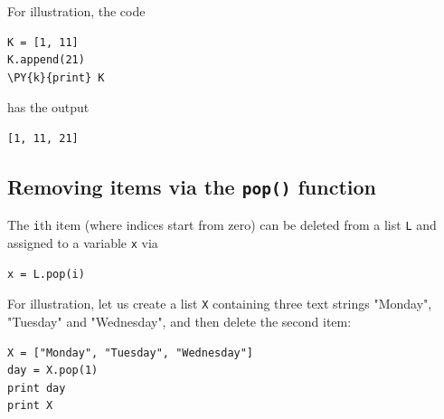 \noindent
For illustration, the code\\

\begin{bbox}
\begin{Verbatim}[commandchars=\\\{\}]
K = [1, 11]
K.append(21)
\PY{k}{print} K
\end{Verbatim}
\end{bbox}
\vspace{6mm}

\noindent
has the output\\

\begin{ybox}
\begin{Verbatim}[commandchars=\\\{\}]
[1, 11, 21]
\end{Verbatim}
\end{ybox}
\vspace{6mm}

\subsection[\ \ Removing items via the {\tt pop()} function]{Removing items via the {\tt pop()} function}

\noindent
The {\tt i}th item (where indices start from zero) can be deleted 
from a list {\tt L} and assigned to a variable {\tt x} via \\

\begin{bbox}
\begin{Verbatim}[commandchars=\\\{\}]
x = L.pop(i)
\end{Verbatim}
\end{bbox}
\vspace{6mm}

\noindent
For illustration, let us create a list {\tt X} containing 
three text strings "Monday", "Tuesday" and "Wednesday", and then
delete the second item:\\

\begin{bbox}
\begin{Verbatim}[commandchars=\\\{\}]
X = ["Monday", "Tuesday", "Wednesday"]
day = X.pop(1)
print day
print X
\end{Verbatim}
\end{bbox}
\vspace{6mm}

